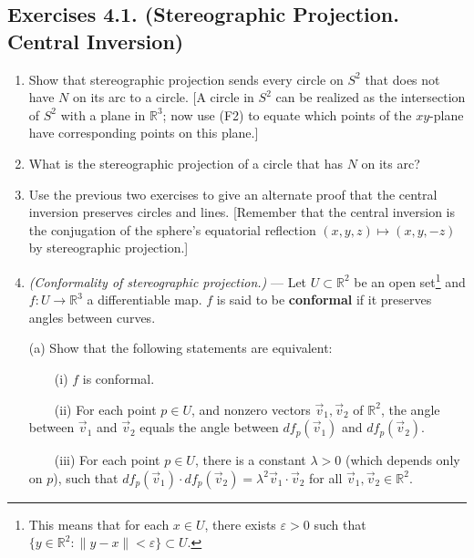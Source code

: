 \documentclass[leqno]{book}
\begin{document}
\subsection*{Exercises 4.1. (Stereographic Projection.  Central Inversion)} %
\begin{enumerate}
\item Show that stereographic projection sends every circle on $S^2$ that does not have $N$ on its arc to a circle.  [A circle in $S^2$ can be realized as the intersection of $S^2$ with a plane in $\mathbb R^3$; now use (F2) to equate which points of the $xy$-plane have corresponding points on this plane.]

\item What is the stereographic projection of a circle that has $N$ on its arc?

\item Use the previous two exercises to give an alternate proof that the central inversion preserves circles and lines.  [Remember that the central inversion is the conjugation of the sphere's equatorial reflection $(x,y,z)\mapsto(x,y,-z)$ by stereographic projection.]

\item\emph{(Conformality of stereographic projection.)} \---- Let $U\subset\mathbb R^2$ be an open set\footnote{This means that for each $x\in U$, there exists $\varepsilon>0$ such that $\{y\in\mathbb R^2:\|y-x\|<\varepsilon\}\subset U$.} and $f:U\to\mathbb R^3$ a differentiable map.  $f$ is said to be \textbf{conformal} if it preserves angles between curves.

(a) Show that the following statements are equivalent:

~~~~(i) $f$ is conformal.

~~~~(ii) For each point $p\in U$, and nonzero vectors $\vec v_1,\vec v_2$ of $\mathbb R^2$, the angle between $\vec v_1$ and $\vec v_2$ equals the angle between $df_p(\vec v_1)$ and $df_p(\vec v_2)$.

~~~~(iii) For each point $p\in U$, there is a constant $\lambda>0$ (which depends only on $p$), such that $df_p(\vec v_1)\cdot df_p(\vec v_2)=\lambda^2\vec v_1\cdot\vec v_2$ for all $\vec v_1,\vec v_2\in\mathbb R^2$.


\end{enumerate}
\end{document}
